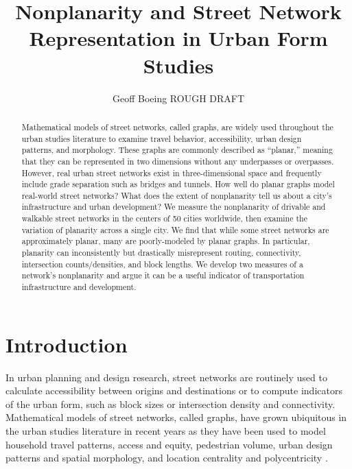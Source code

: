 \documentclass[Afour,sageh,times]{sagej}
\begin{document}
\title{Nonplanarity and Street Network Representation in Urban Form Studies}
\author{Geoff Boeing ROUGH DRAFT }


\begin{abstract}

Mathematical models of street networks, called graphs, are widely used throughout the urban studies literature to examine travel behavior, accessibility, urban design patterns, and morphology. These graphs are commonly described as \enquote{planar,} meaning that they can be represented in two dimensions without any underpasses or overpasses. However, real urban street networks exist in three-dimensional space and frequently include grade separation such as bridges and tunnels. How well do planar graphs model real-world street networks? What does the extent of nonplanarity tell us about a city's infrastructure and urban development? We measure the nonplanarity of drivable and walkable street networks in the centers of 50 cities worldwide, then examine the variation of planarity across a single city. We find that while some street networks are approximately planar, many are poorly-modeled by planar graphs. In particular, planarity can inconsistently but drastically misrepresent routing, connectivity, intersection counts/densities, and block lengths. We develop two measures of a network's nonplanarity and argue it can be a useful indicator of transportation infrastructure and development.

\end{abstract}


\maketitle

\section{Introduction}

In urban planning and design research, street networks are routinely used to calculate accessibility between origins and destinations or to compute indicators of the urban form, such as block sizes or intersection density and connectivity. Mathematical models of street networks, called graphs, have grown ubiquitous in the urban studies literature in recent years as they have been used to model household travel patterns, access and equity, pedestrian volume, urban design patterns and spatial morphology, and location centrality and polycentricity \citep{marshall_street_2010,porta_alterations_2014,marshall_community_2014,hajrasouliha_impact_2015,parthasarathi_street_2015,knight_metrics_2015,gil_street_2016,zhong_revealing_2017}.
\end{document}
